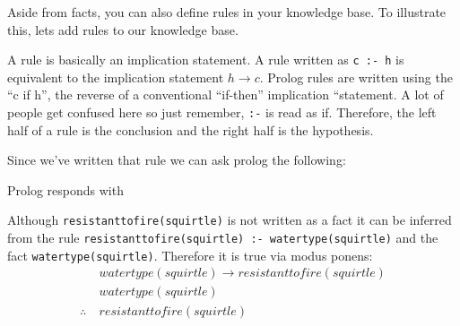 Aside from facts, you can also define rules in your knowledge base. To
illustrate this, lets add rules to our knowledge base.

\begin{Shaded}
\begin{Highlighting}[]

\KeywordTok{:{-}}
\end{Highlighting}
\end{Shaded}

A rule is basically an implication statement. A rule written as
\texttt{c\ :-\ h} is equivalent to the implication statement
\(h \to c\). Prolog rules are written using the ``c if h'', the reverse
of a conventional ``if-then'' implication ``statement. A lot of people
get confused here so just remember, \texttt{:-} is read as if.
Therefore, the left half of a rule is the conclusion and the right half
is the hypothesis.

Since we've written that rule we can ask prolog the following:

\begin{Shaded}
\begin{Highlighting}[]
\end{Highlighting}
\end{Shaded}

Prolog responds with

\begin{Shaded}
\begin{Highlighting}[]
\end{Highlighting}
\end{Shaded}

Although \texttt{resistanttofire(squirtle)} is not written as a fact it
can be inferred from the rule
\texttt{resistanttofire(squirtle)\ :-\ watertype(squirtle)} and the fact
\texttt{watertype(squirtle)}. Therefore it is true via modus ponens: \[
\begin{aligned}
&watertype(squirtle) \to resistanttofire(squirtle)\\
&watertype(squirtle)\\
\hline 
\therefore ~& resistanttofire(squirtle)
\end{aligned}
\]

